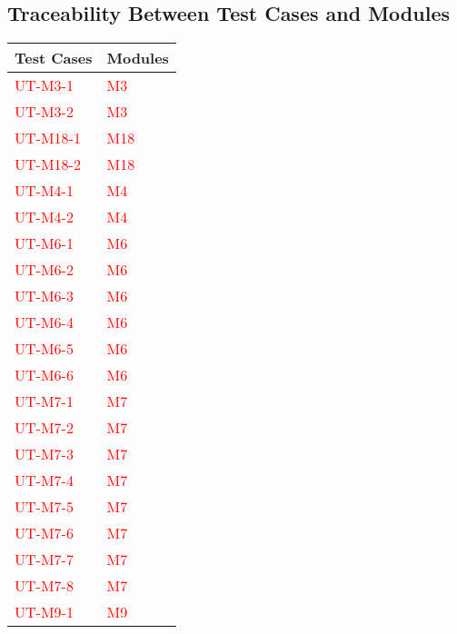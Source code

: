 \documentclass[12pt, titlepage]{article}
\begin{document}
\subsection{Traceability Between Test Cases and Modules}

\begin{table}[H]
	\centering
	\begin{tabular}{p{} p{}}
		\toprule
		\textbf{Test Cases} & \textbf{Modules}\\
		\midrule
		\textcolor{red}{UT-M3-1} & \textcolor{red}{M3}\\
            \textcolor{red}{UT-M3-2} & \textcolor{red}{M3}\\
            \textcolor{red}{UT-M18-1} & \textcolor{red}{M18}\\
            \textcolor{red}{UT-M18-2} & \textcolor{red}{M18}\\
            \textcolor{red}{UT-M4-1} & \textcolor{red}{M4}\\
            \textcolor{red}{UT-M4-2} & \textcolor{red}{M4}\\
            \textcolor{red}{UT-M6-1} & \textcolor{red}{M6}\\
            \textcolor{red}{UT-M6-2} & \textcolor{red}{M6}\\
            \textcolor{red}{UT-M6-3} & \textcolor{red}{M6}\\
            \textcolor{red}{UT-M6-4} & \textcolor{red}{M6}\\
            \textcolor{red}{UT-M6-5} & \textcolor{red}{M6}\\
            \textcolor{red}{UT-M6-6} & \textcolor{red}{M6}\\
            \textcolor{red}{UT-M7-1} & \textcolor{red}{M7}\\
            \textcolor{red}{UT-M7-2} & \textcolor{red}{M7}\\
            \textcolor{red}{UT-M7-3} & \textcolor{red}{M7}\\
            \textcolor{red}{UT-M7-4} & \textcolor{red}{M7}\\
            \textcolor{red}{UT-M7-5} & \textcolor{red}{M7}\\
            \textcolor{red}{UT-M7-6} & \textcolor{red}{M7}\\
            \textcolor{red}{UT-M7-7} & \textcolor{red}{M7}\\
            \textcolor{red}{UT-M7-8} & \textcolor{red}{M7}\\
            \textcolor{red}{UT-M9-1} & \textcolor{red}{M9}\\

\end{tabular}
\end{table}
\end{document}
